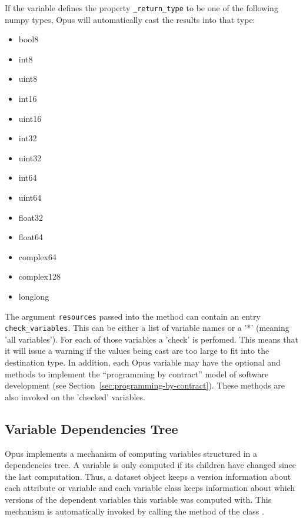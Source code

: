 {If the variable \variablesindex defines the property \verb|_return_type| to be one of the
following numpy types, Opus will automatically cast the results into that
type: 
\begin{itemize}
\tight
\item bool8
\item int8
\item uint8
\item int16
\item uint16
\item int32
\item uint32
\item int64
\item uint64
\item float32
\item float64
\item complex64
\item complex128
\item longlong
\end{itemize}
The argument \verb|resources| passed into the  method can 
contain an entry \verb|check_variables|. This can be either a list of variable names or a '*' (meaning 'all variables').
For each of those variables a 'check' is perfomed.
This means that it will issue a warning if
the values being cast are too large to fit into the destination type.
In addition, each Opus variable \variablesindex may have the optional  and
 methods to implement the ``programming by contract''
 model of software development (see
Section~\ref{sec:programming-by-contract}). These methods are also invoked on the 'checked' variables. 

\subsection{Variable Dependencies Tree}
\label{sec:dependencies-tree}
\variablesindex
%
Opus implements a mechanism of computing variables \variablesindex structured in a
dependencies tree. A variable \variablesindex is only computed if its children have changed
since the last computation. Thus, a dataset \datasetindex object keeps a version information
about each attribute \attributesindex or variable \variablesindex and each variable \variablesindex class keeps information
about which versions of the dependent variables \variablesindex this variable \variablesindex was
computed with. This mechanism is automatically invoked by calling the method
 \variablesindex of the class . \datasetindex

}
